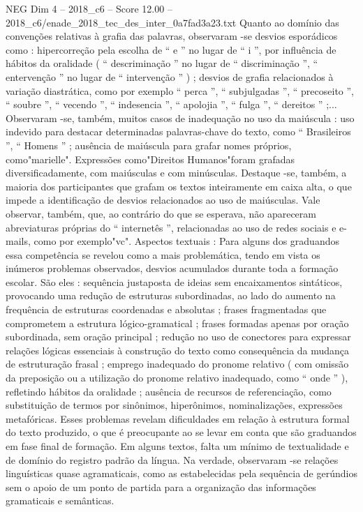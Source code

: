 \begin{textsample}{NEG Dim 4 – 2018\_c6 – Score 12.00 – 2018\_c6/enade\_2018\_tec\_des\_inter\_0a7fad3a23.txt}
Quanto ao domínio das convenções relativas à grafia das palavras, observaram -se desvios esporádicos como : hipercorreção pela escolha de “ e ” no lugar de “ i ”, por influência de hábitos da oralidade ( “ descriminação ” no lugar de “ discriminação ”, “ entervenção ” no lugar de “ intervenção ” ) ; desvios de grafia relacionados à variação diastrática, como por exemplo “ perca ”, “ subjulgadas ”, “ precoseito ”, “ soubre ”, “ vecendo ”, “ indesencia ”, “ apolojia ”, “ fulga ”, “ dereitos ” ;...
Observaram -se, também, muitos casos de inadequação no uso da maiúscula : uso indevido para destacar determinadas palavras-chave do texto, como “ Brasileiros ”, “ Homens ” ; ausência de maiúscula para grafar nomes próprios, como"marielle".
Expressões como"Direitos Humanos"foram grafadas diversificadamente, com maiúsculas e com minúsculas.
Destaque -se, também, a maioria dos participantes que grafam os textos inteiramente em caixa alta, o que impede a identificação de desvios relacionados ao uso de maiúsculas.
Vale observar, também, que, ao contrário do que se esperava, não apareceram abreviaturas próprias do “ internetês ”, relacionadas ao uso de redes sociais e e-mails, como por exemplo"vc".
Aspectos textuais : Para alguns dos graduandos essa competência se revelou como a mais problemática, tendo em vista os inúmeros problemas observados, desvios acumulados durante toda a formação escolar.
São eles : sequência justaposta de ideias sem encaixamentos sintáticos, provocando uma redução de estruturas subordinadas, ao lado do aumento na frequência de estruturas coordenadas e absolutas ; frases fragmentadas que comprometem a estrutura lógico-gramatical ; frases formadas apenas por oração subordinada, sem oração principal ; redução no uso de conectores para expressar relações lógicas essenciais à construção do texto como consequência da mudança de estruturação frasal ; emprego inadequado do pronome relativo ( com omissão da preposição ou a utilização do pronome relativo inadequado, como “ onde ” ), refletindo hábitos da oralidade ; ausência de recursos de referenciação, como substituição de termos por sinônimos, hiperônimos, nominalizações, expressões metafóricas.
Esses problemas revelam dificuldades em relação à estrutura formal do texto produzido, o que é preocupante ao se levar em conta que são graduandos em fase final de formação.
Em alguns textos, falta um mínimo de textualidade e de domínio do registro padrão da língua.
Na verdade, observaram -se relações linguísticas quase agramaticais, como as estabelecidas pela sequência de gerúndios sem o apoio de um ponto de partida para a organização das informações gramaticais e semânticas.

\end{textsample}
